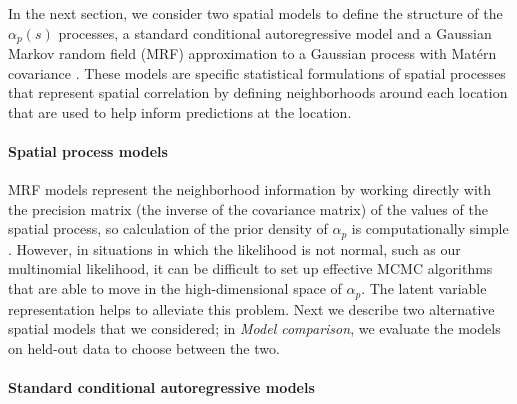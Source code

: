 \documentclass[10pt,letterpaper]{article}
\newcommand{\matern}{Mat\'{e}rn }
\begin{document}
In the next section, we consider two spatial models to define the
structure of the $\alpha_{p}(s)$ processes, a standard conditional
autoregressive model \cite{Bane:etal:2004} and a Gaussian Markov
random field (MRF) approximation to a Gaussian process with \matern
covariance \cite{Lind:etal:2011}. These models are
specific statistical formulations of spatial processes that represent
spatial correlation by defining neighborhoods around each location
that are used to help inform predictions at the location. 


\paragraph*{Spatial process models}

MRF models represent the neighborhood information
by working directly with the precision matrix (the
inverse of the covariance matrix) of the values of the spatial process,
so calculation of the prior density of $\alpha_{p}$ is computationally
simple \cite{Rue:Held:2005}. However, in situations
in which the likelihood is not normal, such
as our multinomial likelihood, it can be difficult to set up effective
MCMC algorithms that are able to move in the high-dimensional space
of $\alpha_{p}$. The latent variable representation
helps to alleviate this problem. Next we describe two alternative
spatial models that we considered; in \emph{Model comparison},
we evaluate the models on held-out data to choose
between the two.

\paragraph{Standard conditional autoregressive models}
\end{document}
